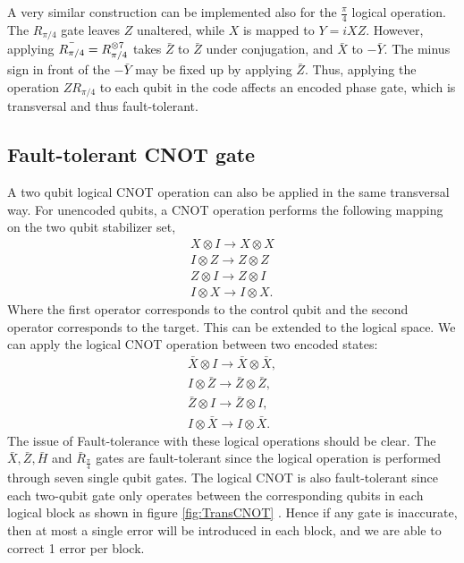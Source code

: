 A very similar construction can be implemented also for the $\frac{\pi}{4}$ logical operation.  The $R_{\pi/4}$ gate leaves $Z$ unaltered, while $X$ is mapped to $Y=iXZ$. However, applying 
$\Bar{R_{\pi/4}}=R_{\pi/4}^{\otimes7}$ takes $\bar{Z}$ to $\bar{Z}$ under conjugation, and $\bar{X}$ to $-\bar{Y}.$ The minus sign in front of the $-\bar{Y}$ may be fixed up by applying $\bar{Z}$.
Thus, applying the operation $Z R_{\pi/4}$ to each qubit in the code affects an encoded phase gate, which is transversal and thus fault-tolerant.


\subsection*{Fault-tolerant CNOT gate}

A two qubit logical CNOT operation can also be applied in the same transversal way. For unencoded qubits, a CNOT operation performs the following mapping on the two qubit stabilizer set,
$$
\begin{array}{l}
X \otimes I \rightarrow X \otimes X \\
I \otimes Z \rightarrow Z \otimes Z \\
Z \otimes I \rightarrow Z \otimes I \\
I \otimes X \rightarrow I \otimes X .
\end{array}
$$
Where the first operator corresponds to the control qubit and the second operator corresponds to the target. This can be extended to the logical space. We can apply the logical CNOT operation between two encoded states: 
$$
\begin{array}{l}
\bar{X} \otimes I \rightarrow \bar{X} \otimes \bar{X}, \\
I \otimes \bar{Z} \rightarrow \bar{Z} \otimes \bar{Z}, \\
\bar{Z} \otimes I \rightarrow \bar{Z} \otimes I, \\
I \otimes \bar{X} \rightarrow I \otimes \bar{X} .
\end{array}
$$
The issue of Fault-tolerance with these logical operations should be clear. The $\bar{X}, \bar{Z}, \bar{H}$ and $\bar{R}_{\frac{\pi}{4}}$ gates are fault-tolerant since the logical operation is performed through seven single qubit gates. The logical CNOT is also fault-tolerant since each two-qubit gate only operates between the corresponding qubits in each logical block as shown in figure \ref{fig:TransCNOT} . Hence if any gate is inaccurate, then at most a single error will be introduced in each block, and we are able to correct 1 error per block. 
